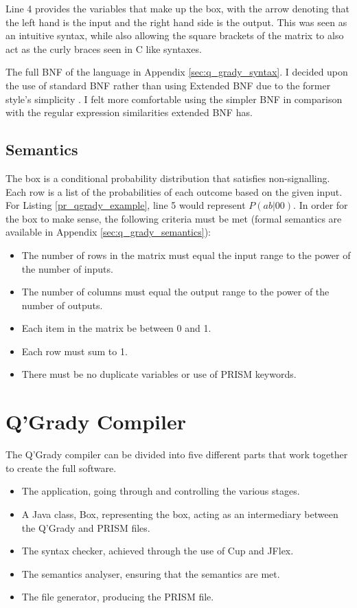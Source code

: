 \documentclass[report.tex]{subfiles}
\begin{document}
Line 4 provides the variables that make up the box, with the arrow denoting that
the left hand is the input and the right hand side is the output. This was seen
as an intuitive syntax, while also allowing the square brackets of the matrix to
also act as the curly braces seen in C like syntaxes.

The full BNF of the language in Appendix \ref{sec:q_grady_syntax}. I decided
upon the use of standard BNF rather than using Extended BNF due to the former
style's simplicity \cite[chapter 2.3.4, p.~38]{Watt:1991:PLS:120468}. I felt
more comfortable using the simpler BNF in comparison with the regular expression
similarities extended BNF has.

\subsection{Semantics} %
\label{sec:semantics}
The box is a conditional probability distribution that satisfies non-signalling.
Each row is a list of the probabilities of each outcome based on the given
input. For Listing \ref{pr_qgrady_example}, line 5 would represent 
\(P(ab | 00)\). In order for the box to make sense, the following criteria must
be met (formal semantics are available in Appendix \ref{sec:q_grady_semantics}):
\begin{itemize}
    \item The number of rows in the matrix must equal the input range to the
    power of the number of inputs.
    \item The number of columns must equal the output range to the power of the
    number of outputs.
    \item Each item in the matrix be between 0 and 1.
    \item Each row must sum to 1.
    \item There must be no duplicate variables or use of PRISM keywords.
\end{itemize}


\section{Q'Grady Compiler} %
\label{sec:q_grady_compiler}
The Q'Grady compiler can be divided into five different parts that work
together to create the full software.
\begin{itemize}
    \item The application, going through and controlling the various stages.
    \item A Java class, Box, representing the box, acting as an intermediary
    between the Q'Grady and PRISM files.
    \item The syntax checker, achieved through the use of Cup and JFlex.
    \item The semantics analyser, ensuring that the semantics are met.
    \item The file generator, producing the PRISM file.
\end{itemize}
\end{document}
